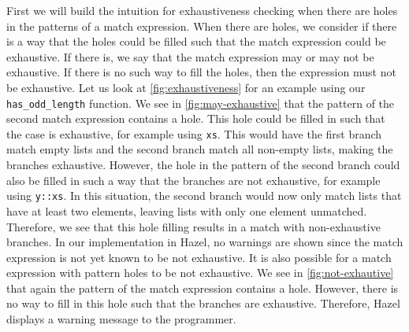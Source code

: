 First we will build the intuition for exhaustiveness checking when there are holes in the patterns of a match expression. When there are holes, we consider if there is a way that the holes could be filled such that the match expression could be exhaustive. If there is, we say that the match expression may or may not be exhaustive. If there is no such way to fill the holes, then the expression must not be exhaustive. Let us look at \autoref{fig:exhaustiveness} for an example using our \texttt{has\_odd\_length} function. We see in \autoref{fig:may-exhaustive} that the pattern of the second match expression contains a hole. This hole could be filled in such that the case is exhaustive, for example using \texttt{xs}. This would have the first branch match empty lists and the second branch match all non-empty lists, making the branches exhaustive. However, the hole in the pattern of the second branch could also be filled in such a way that the branches are not exhaustive, for example using \texttt{y::xs}. In this situation, the second branch would now only match lists that have at least two elements, leaving lists with only one element unmatched. Therefore, we see that this hole filling results in a match with non-exhaustive branches. In our implementation in Hazel, no warnings are shown since the match expression is not yet known to be not exhaustive. It is also possible for a match expression with pattern holes to be not exhaustive. We see in \autoref{fig:not-exhautive} that again the pattern of the match expression contains a hole. However, there is no way to fill in this hole such that the branches are exhaustive. Therefore, Hazel displays a warning message to the programmer.

